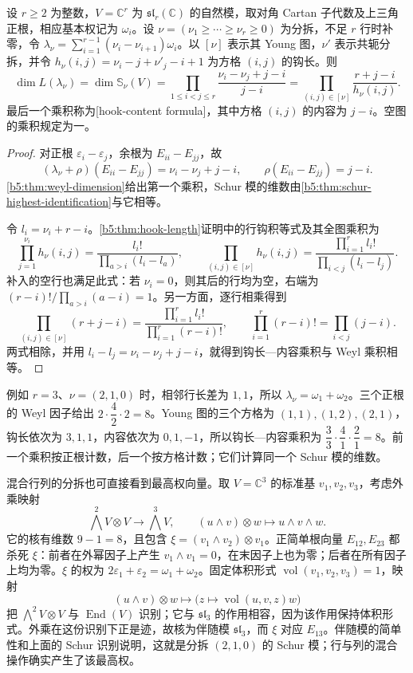 \begin{corollary}\label{b5:cor:type-a-hook-content-dimension}
	设 \(r\ge2\) 为整数，\(V=\mathbb C^r\) 为 \(\mathfrak{sl}_r(\mathbb C)\) 的自然模，取对角 Cartan 子代数及上三角正根，相应基本权记为 \(\omega_i\)。设 \(\nu=(\nu_1\ge\cdots\ge\nu_r\ge0)\) 为分拆，不足 \(r\) 行时补零，令 \(\lambda_\nu=\sum_{i=1}^{r-1}(\nu_i-\nu_{i+1})\omega_i\)。以 \([\nu]\) 表示其 Young 图，\(\nu'\) 表示共轭分拆，并令 \(h_\nu(i,j)=\nu_i-j+\nu'_j-i+1\) 为方格 \((i,j)\) 的钩长。则
	\[
		\dim L(\lambda_\nu)=\dim\mathbb S_\nu(V) =\prod_{1\le i<j\le r}\frac{\nu_i-\nu_j+j-i}{j-i} =\prod_{(i,j)\in[\nu]}\frac{r+j-i}{h_\nu(i,j)}.
	\]
	最后一个乘积称为[hook-content formula]，其中方格 \((i,j)\) 的内容为 \(j-i\)。空图的乘积规定为一。
\end{corollary}
\begin{proof}
	对正根 \(\varepsilon_i-\varepsilon_j\)，余根为 \(E_{ii}-E_{jj}\)，故
	\[
		(\lambda_\nu+\rho)(E_{ii}-E_{jj})=\nu_i-\nu_j+j-i, \qquad \rho(E_{ii}-E_{jj})=j-i.
	\]
	\cref{b5:thm:weyl-dimension}给出第一个乘积，Schur 模的维数由\cref{b5:thm:schur-highest-identification}与它相等。

	令 \(l_i=\nu_i+r-i\)。\cref{b5:thm:hook-length}证明中的行钩积等式及其全图乘积为
	\[
		\prod_{j=1}^{\nu_i}h_\nu(i,j) =\frac{l_i!}{\prod_{a>i}(l_i-l_a)},\qquad \prod_{(i,j)\in[\nu]}h_\nu(i,j) =\frac{\prod_{i=1}^r l_i!}{\prod_{i<j}(l_i-l_j)}.
	\]
	补入的空行也满足此式：若 \(\nu_i=0\)，则其后的行均为空，右端为 \((r-i)!/\prod_{a>i}(a-i)=1\)。另一方面，逐行相乘得到
	\[
		\prod_{(i,j)\in[\nu]}(r+j-i) =\frac{\prod_{i=1}^r l_i!}{\prod_{i=1}^r(r-i)!}, \qquad \prod_{i=1}^r(r-i)!=\prod_{i<j}(j-i).
	\]
	两式相除，并用 \(l_i-l_j=\nu_i-\nu_j+j-i\)，就得到钩长—内容乘积与 Weyl 乘积相等。
\end{proof}

例如 \(r=3\)、\(\nu=(2,1,0)\) 时，相邻行长差为 \(1,1\)，所以 \(\lambda_\nu=\omega_1+\omega_2\)。三个正根的 Weyl 因子给出 \(2\cdot\dfrac42\cdot2=8\)。Young 图的三个方格为 \((1,1),(1,2),(2,1)\)，钩长依次为 \(3,1,1\)，内容依次为 \(0,1,-1\)，所以钩长—内容乘积为 \(\dfrac33\cdot\dfrac41\cdot\dfrac21=8\)。前一个乘积按正根计数，后一个按方格计数；它们计算同一个 Schur 模的维数。

\ProseParagraphBreak
混合行列的分拆也可直接看到最高权向量。取 \(V=\mathbb C^3\) 的标准基 \(v_1,v_2,v_3\)，考虑外乘映射
\[
	\bigwedge^2V\otimes V\longrightarrow\bigwedge^3V, \qquad (u\wedge v)\otimes w\longmapsto u\wedge v\wedge w.
\]
它的核有维数 \(9-1=8\)，且包含 \(\xi=(v_1\wedge v_2)\otimes v_1\)。正简单根向量 \(E_{12},E_{23}\) 都杀死 \(\xi\)：前者在外幂因子上产生 \(v_1\wedge v_1=0\)，在末因子上也为零；后者在所有因子上均为零。\(\xi\) 的权为 \(2\varepsilon_1+\varepsilon_2=\omega_1+\omega_2\)。固定体积形式 \(\operatorname{vol}(v_1,v_2,v_3)=1\)，映射
\[
	(u\wedge v)\otimes w\longmapsto \bigl(z\longmapsto\operatorname{vol}(u,v,z)w\bigr)
\]
把 \(\bigwedge^2V\otimes V\) 与 \(\operatorname{End}(V)\) 识别；它与 \(\mathfrak{sl}_3\) 的作用相容，因为该作用保持体积形式。外乘在这份识别下正是迹，故核为伴随模 \(\mathfrak{sl}_3\)，而 \(\xi\) 对应 \(E_{13}\)。伴随模的简单性和上面的 Schur 识别说明，这就是分拆 \((2,1,0)\) 的 Schur 模；行与列的混合操作确实产生了该最高权。

